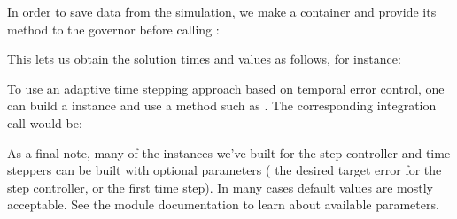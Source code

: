 \documentclass[letterpaper,10pt,english]{sphinxmanual}
\begin{document}
In order to save data from the simulation, we make a container and provide its  method to the governor before calling :

\begin{sphinxVerbatim}[commandchars=\\\{\}]
  
  
\end{sphinxVerbatim}

This lets us obtain the solution times and values as follows, for instance:

\begin{sphinxVerbatim}[commandchars=\\\{\}]
  
  \PYG{p}{[} \PYG{p}{]}
\end{sphinxVerbatim}

To use an adaptive time stepping approach based on temporal error control, one can build a  instance and
use a method such as .
The corresponding integration call would be:

\begin{sphinxVerbatim}[commandchars=\\\{\}]
     
\end{sphinxVerbatim}

As a final note, many of the instances we’ve built for the step controller and time steppers can be built with
optional parameters ( the desired target error for the step controller, or the first time step).
In many cases default values are mostly acceptable.
See the module documentation to learn about available parameters.
\end{document}
